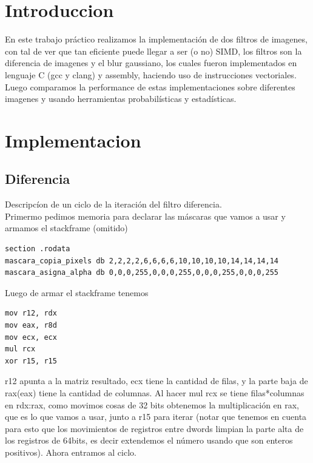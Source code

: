 \documentclass[a4paper]{article}
\begin{document}
\thispagestyle{empty}


\maketitle 

\tableofcontents

\newpage

\section{Introduccion}
En este trabajo práctico realizamos la implementación de dos filtros de imagenes, con tal de ver que tan eficiente puede llegar a ser (o no) SIMD, los filtros son la diferencia de imagenes y el blur gaussiano, los cuales fueron implementados en lenguaje C (gcc y clang) y assembly, haciendo uso de instrucciones vectoriales. Luego comparamos la performance de estas implementaciones sobre diferentes imagenes y usando herramientas probabilísticas y estadísticas.

\section{Implementacion}

\subsection{Diferencia}
\noindent Descripcíon de un ciclo de la iteración del filtro diferencia.\\
Primermo pedimos memoria para declarar las máscaras que vamos a usar y armamos el stackframe (omitido)
\begin{codesnippet}
\begin{verbatim}
section .rodata
mascara_copia_pixels db 2,2,2,2,6,6,6,6,10,10,10,10,14,14,14,14
mascara_asigna_alpha db 0,0,0,255,0,0,0,255,0,0,0,255,0,0,0,255
\end{verbatim}
\end{codesnippet}

\noindent Luego de armar el stackframe tenemos
\begin{codesnippet}
\begin{verbatim}
mov r12, rdx
mov eax, r8d
mov ecx, ecx
mul rcx
xor r15, r15
\end{verbatim}
\end{codesnippet}
r12 apunta a la matriz resultado, ecx tiene la cantidad de filas, y la parte baja de rax(eax) tiene la cantidad de columnas. Al hacer mul rcx se tiene filas*columnas en rdx:rax, como movimos cosas de 32 bits obtenemos la multiplicación en rax, que es lo que vamos a usar, junto a r15 para iterar (notar que tenemos en cuenta para esto que los movimientos de registros entre dwords limpian la parte alta de los registros de 64bits, es decir extendemos el número usando que son enteros positivos). Ahora entramos al ciclo.
\end{document}
